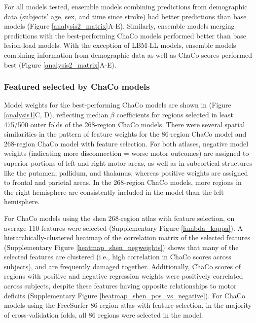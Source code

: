 \documentclass[10pt]{article}
\begin{document}
For all models tested, ensemble models combining predictions from demographic data (subjects' age, sex, and time since stroke) had better predictions than base models (Figure \ref{analysis2_matrix}A-E). Similarly, ensemble models merging predictions with the best-performing ChaCo models performed better than base lesion-load models. With the exception of LBM-LL models, ensemble models combining information from demographic data as well as ChaCo scores performed best (Figure \ref{analysis2_matrix}A-E).


\subsubsection*{Featured selected by ChaCo models}

Model weights for the best-performing ChaCo models are shown in (Figure \ref{analysis1}C, D), reflecting median $\beta$ coefficients for regions selected in least 475/500 outer folds of the 268-region ChaCo models. There were several spatial similarities in the pattern of feature weights for the 86-region ChaCo model and 268-region ChaCo model with feature selection. For both atlases, negative model weights (indicating more disconnection = worse motor outcomes) are assigned to superior portions of left and right motor areas, as well as in subcortical structures like the putamen, pallidum, and thalamus, whereas positive weights are assigned to frontal and parietal areas. In the 268-region ChaCo models, more regions in the right hemisphere are consistently included in the model than the left hemisphere. 

For ChaCo models using the shen 268-region atlas with feature selection, on average 110 features were selected (Supplementary Figure \ref{lambda_kappa}). A hierarchically-clustered heatmap of the correlation matrix of the selected features (Supplementary Figure \ref{heatmap_shen_negweights}) shows that many of the selected features are clustered (i.e., high correlation in ChaCo scores across subjects), and are frequently damaged together. Additionally, ChaCo scores of regions with positive and negative regression weights were positively correlated across subjects, despite these features having opposite relationships to motor deficits (Supplementary Figure \ref{heatmap_shen_pos_vs_negative}). For ChaCo models using the FreeSurfer 86-region atlas with feature selection, in the majority of cross-validation folds, all 86 regions were selected in the model. 
\end{document}

